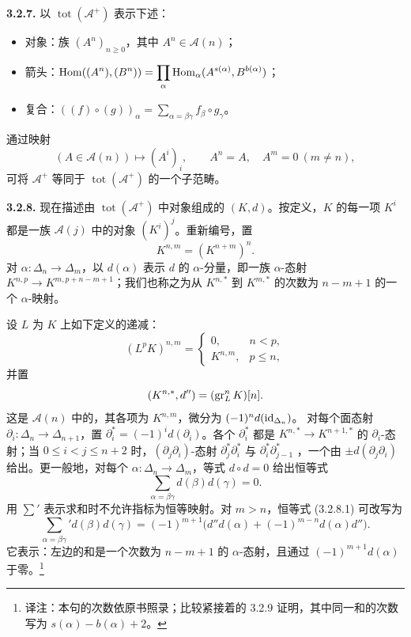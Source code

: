 \par\medskip\noindent\textbf{3.2.7.}
以 $\operatorname{tot}(\mathcal A^+)$ 表示下述：
\begin{itemize}
\item 对象：族 $(A^n)_{n\geq0}$，其中 $A^n\in\mathcal A(n)$；
\item 箭头：$\displaystyle
\operatorname{Hom}((A^n),(B^n))=\prod_\alpha\operatorname{Hom}_\alpha(A^{s(\alpha)},B^{b(\alpha)})$；
\item 复合：$\displaystyle
((f)\circ(g))_\alpha=\sum_{\alpha=\beta\gamma}f_\beta\circ g_\gamma$。
\end{itemize}
通过映射
\[
(A\in\mathcal A(n))\longmapsto
(A^i)_i,\qquad A^n=A,\quad A^m=0\ (m\ne n),
\]
可将 $\mathcal A^+$ 等同于 $\operatorname{tot}(\mathcal A^+)$ 的一个子范畴。

\par\medskip\noindent\textbf{3.2.8.}
现在描述由 $\operatorname{tot}(\mathcal A^+)$ 中对象组成的 $(K,d)$。按定义，$K$ 的每一项 $K^i$ 都是一族 $\mathcal A(j)$ 中的对象 $(K^i)^j$。重新编号，置
\[
K^{n,m}=(K^{n+m})^n.
\]
对 $\alpha:\Delta_n\longrightarrow\Delta_m$，以 $d(\alpha)$ 表示 $d$ 的 $\alpha$-分量，即一族 $\alpha$-态射
$K^{n,p}\longrightarrow K^{m,p+n-m+1}$；我们也称之为从 $K^{n,*}$ 到 $K^{m,*}$ 的次数为 $n-m+1$ 的一个 $\alpha$-映射。

设 $L$ 为 $K$ 上如下定义的递减：
\[
(L^pK)^{n,m}=\begin{cases}
0,&n<p,\\
K^{n,m},&p\leq n,
\end{cases}
\]
并置
\[
(K^{n,*},d'')=(\operatorname{gr}_L^nK)[n].
\]
这是 $\mathcal A(n)$ 中的，其各项为 $K^{n,m}$，微分为
$(-1)^nd(\operatorname{id}_{\Delta_n})$。
对每个面态射 $\partial_i:\Delta_n\longrightarrow\Delta_{n+1}$，置
$\partial_i^*=(-1)^id(\partial_i)$。各个 $\partial_i^*$ 都是
$K^{n,*}\longrightarrow K^{n+1,*}$ 的 $\partial_i$-态射；当
$0\leq i<j\leq n+2$ 时，$(\partial_j\partial_i)$-态射
$\partial_j^*\partial_i^*$ 与 $\partial_i^*\partial_{j-1}^*$ ，一个由
$\pm d(\partial_j\partial_i)$ 给出。更一般地，对每个
$\alpha:\Delta_n\longrightarrow\Delta_m$，等式 $d\circ d=0$ 给出恒等式
\begin{equation*}
\sum_{\alpha=\beta\gamma}d(\beta)d(\gamma)=0.
\tag{3.2.8.1}
\end{equation*}
用 $\sum'$ 表示求和时不允许指标为恒等映射。对 $m>n$，恒等式 (3.2.8.1) 可改写为
\begin{equation*}
\sum_{\alpha=\beta\gamma}'d(\beta)d(\gamma)
 =(-1)^{m+1}\bigl(d''d(\alpha)+(-1)^{m-n}d(\alpha)d''\bigr).
\tag{3.2.8.2}
\end{equation*}
它表示：左边的和是一个次数为 $n-m+1$ 的 $\alpha$-态射，且通过 $(-1)^{m+1}d(\alpha)$ 于零。\footnote{译注：本句的次数依原书照录；比较紧接着的 3.2.9 证明，其中同一和的次数写为 $s(\alpha)-b(\alpha)+2$。}

